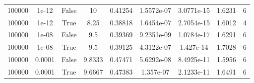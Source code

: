 \begin{table}
\begin{tabular}{ccccccccc}
100000 & 1e-12 & False & 10 & 0.41254 & 1.5572e-07 & 3.0771e-15 & 1.6231 & 6 \\
100000 & 1e-12 & True & 8.25 & 0.38818 & 1.6454e-07 & 2.7054e-15 & 1.6012 & 4 \\
100000 & 1e-08 & False & 9.5 & 0.39369 & 9.2351e-09 & 1.0784e-17 & 1.6291 & 6 \\
100000 & 1e-08 & True & 9.5 & 0.39125 & 4.3122e-07 & 1.427e-14 & 1.7028 & 6 \\
100000 & 0.0001 & False & 9.8333 & 0.47471 & 5.6292e-08 & 8.4925e-11 & 1.5956 & 6 \\
100000 & 0.0001 & True & 9.6667 & 0.47383 & 1.357e-07 & 2.1233e-11 & 1.6491 & 6 \\
\bottomrule
\end{tabular}
\end{table}
